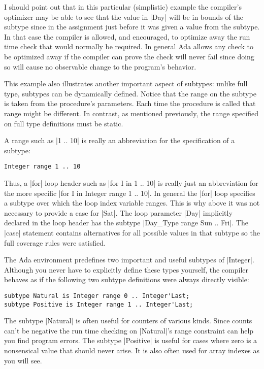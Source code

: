 I should point out that in this particular (simplistic) example the compiler's optimizer may be
able to see that the value in |Day| will be in bounds of the subtype since in the assignment
just before it was given a value from the subtype. In that case the compiler is allowed, and
encouraged, to optimize away the run time check that would normally be required. In general Ada
allows any check to be optimized away if the compiler can prove the check will never fail since
doing so will cause no observable change to the program's behavior.

This example also illustrates another important aspect of subtypes: unlike full type, subtypes
can be dynamically defined. Notice that the range on the subtype is taken from the procedure's
parameters. Each time the procedure is called that range might be different. In contrast, as
mentioned previously, the range specified on full type definitions must be static.

A range such as |1 .. 10| is really an abbreviation for the specification of a subtype:

\begin{lstlisting}
Integer range 1 .. 10
\end{lstlisting}

\noindent Thus, a |for| loop header such as |for I in 1 .. 10| is really just an abbreviation for
the more specific |for I in Integer range 1 .. 10|. In general the |for| loop specifies a
subtype over which the loop index variable ranges. This is why above it was not necessary to
provide a case for |Sat|. The loop parameter |Day| implicitly declared in the loop header has
the subtype |Day_Type range Sun .. Fri|. The |case| statement contains alternatives for all
possible values in that subtype so the full coverage rules were satisfied.

The Ada environment predefines two important and useful subtypes of |Integer|. Although you
never have to explicitly define these types yourself, the compiler behaves as if the following
two subtype definitions were always directly visible:

\begin{lstlisting}
subtype Natural is Integer range 0 .. Integer'Last;
subtype Positive is Integer range 1 .. Integer'Last;
\end{lstlisting}

\noindent The subtype |Natural| is often useful for counters of various kinds. Since counts
can't be negative the run time checking on |Natural|'s range constraint can help you find
program errors. The subtype |Positive| is useful for cases where zero is a nonsensical value
that should never arise. It is also often used for array indexes as you will see.

